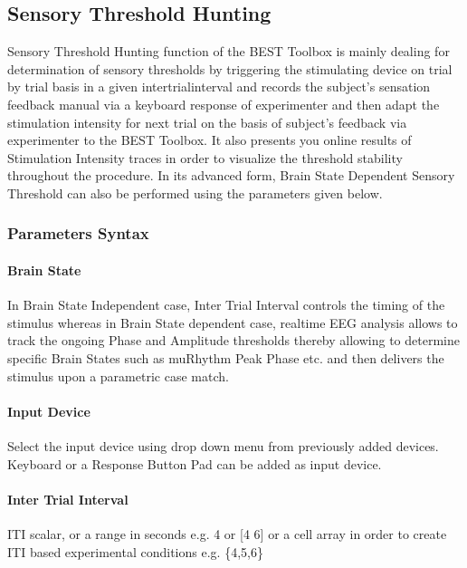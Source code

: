 \documentclass[letterpaper,10pt,english]{sphinxmanual}
\begin{document}
\subsection{Sensory Threshold Hunting}
\label{\detokenize{15_SensoryThresholdHunting:sensory-threshold-hunting}}\label{\detokenize{15_SensoryThresholdHunting::doc}}
\sphinxAtStartPar
Sensory Threshold Hunting function of the BEST Toolbox is mainly dealing for determination of sensory thresholds by triggering the stimulating device on trial by trial basis in a given inter\sphinxhyphen{}trial\sphinxhyphen{}interval and records the subject’s sensation feedback manual via a keyboard response of experimenter and then adapt the stimulation intensity for next trial on the basis of subject’s feedback via experimenter to the BEST Toolbox. It also presents you online results of Stimulation Intensity traces in order to visualize the threshold stability throughout the procedure. In its advanced form, Brain State\sphinxhyphen{} Dependent Sensory Threshold can also be performed using the parameters given below.


\subsubsection{Parameters Syntax}
\label{\detokenize{15_SensoryThresholdHunting:parameters-syntax}}

\paragraph{Brain State}
\label{\detokenize{15_SensoryThresholdHunting:brain-state}}
\sphinxAtStartPar
In Brain State Independent case, Inter Trial Interval controls the timing of the stimulus whereas in Brain State dependent case, real\sphinxhyphen{}time EEG analysis allows to track the ongoing Phase and Amplitude thresholds thereby allowing to determine specific Brain States such as mu\sphinxhyphen{}Rhythm Peak Phase etc. and then delivers the stimulus upon a parametric case match.


\paragraph{Input Device}
\label{\detokenize{15_SensoryThresholdHunting:input-device}}
\sphinxAtStartPar
Select the input device using drop down menu from previously added devices. Keyboard or a Response Button Pad can be added as input device.


\paragraph{Inter Trial Interval}
\label{\detokenize{15_SensoryThresholdHunting:inter-trial-interval}}
\sphinxAtStartPar
ITI scalar, or a range in seconds e.g. 4 or {[}4 6{]} or a cell array in order to create ITI based experimental conditions e.g. \{4,5,6\}
\end{document}
